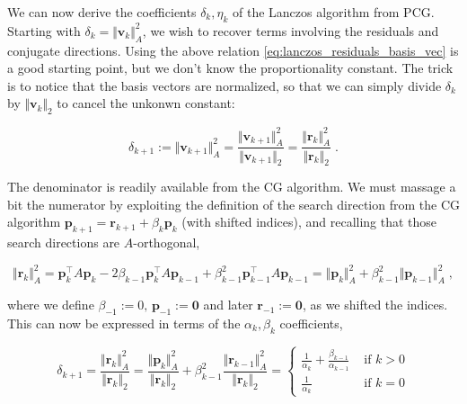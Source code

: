 \documentclass{article}
\newcommand{\vect}[1]{\boldsymbol{\mathbf{#1}}}
\newcommand{\norm}[1]{\Vert #1 \Vert}
\begin{document}
We can now derive the coefficients $\delta_k, \eta_k$ of the Lanczos algorithm from PCG. Starting with $\delta_{k} = \norm{\vect v_k}_A^2$, we wish to recover terms involving the residuals and conjugate directions. Using the above relation \eqref{eq:lanczos_residuals_basis_vec} is a good starting point, but we don't know the proportionality constant. The trick is to notice that the basis vectors are normalized, so that we can simply divide $\delta_k$ by $\norm{\vect v_k}_2$ to cancel the unkonwn constant:

\begin{equation*}
    \delta_{k+1} := \norm{\vect v_{k+1}}_A^2 = \frac{\norm{\vect v_{k+1}}_A^2}{\norm{\vect v_{k+1}}_2} = \frac{\norm{\vect r_{k}}_A^2}{\norm{\vect r_k}_2} \; .
\end{equation*}

The denominator is readily available from the CG algorithm. We must massage a bit the numerator by exploiting the definition of the search direction from the CG algorithm $\vect p_{k+1} = \vect r_{k+1} + \beta_k \vect p_k$ (with shifted indices), and recalling that those search directions are $A$-orthogonal,

\begin{equation*}
    \norm{\vect r_{k}}_A^2 = \vect p_k^\top A \vect p_k - 2 \beta_{k-1} \vect p_k^\top A \vect p_{k-1} + \beta_{k-1}^2 \vect p_{k-1}^\top A \vect p_{k-1} = \norm{\vect p_{k}}_A^2 + \beta_{k-1}^2 \norm{\vect p_{k-1}}_A^2 \; ,
\end{equation*}

where we define $\beta_{-1}:= 0, \, \vect p_{-1} := \vect0$ and later $\vect r_{-1} := \vect 0$, as we shifted the indices. This can now be expressed in terms of the $\alpha_k, \beta_k$ coefficients, 

\begin{equation*}
    \delta_{k+1} = \frac{\norm{\vect r_{k}}_A^2}{\norm{\vect r_k}_2} = \frac{\norm{\vect p_{k}}_A^2}{\norm{\vect r_k}_2} + \beta_{k-1}^2 \frac{\norm{\vect r_{k-1}}_A^2}{\norm{\vect r_k}_2} = \begin{cases}
    \frac {1}{\alpha_k} + \frac{\beta_{k-1}}{\alpha_{k-1}} & \text{ if } k > 0\\
    \frac {1}{\alpha_k} & \text{ if } k = 0
    \end{cases}
\end{equation*}
\end{document}
